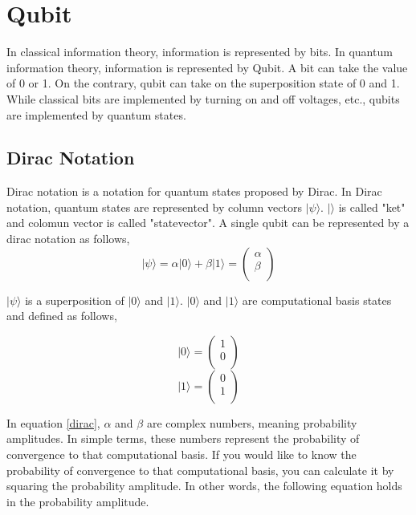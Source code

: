 \section{Qubit}
In classical information theory, information is represented by bits.
In quantum information theory, information is represented by Qubit.
A bit can take the value of 0 or 1.
On the contrary, qubit can take on the superposition state of 0 and 1.
While classical bits are implemented by turning on and off voltages, etc., qubits are implemented by quantum states.

\subsection{Dirac Notation}
Dirac notation is a notation for quantum states proposed by Dirac\cite{dirac1939new}.
In Dirac notation, quantum states are represented by column vectors $|\psi\rangle$.
$| \rangle$ is called "ket" and colomun vector is called "statevector".
A single qubit can be represented by a dirac notation as follows,
\begin{equation}
    \label{dirac}
    |\psi\rangle = \alpha |0\rangle + \beta |1\rangle = 
    \begin{pmatrix}
        \alpha \\
        \beta \\
    \end{pmatrix}
\end{equation}

$|\psi\rangle$ is a superposition of $|0\rangle$ and $|1\rangle$.
$|0\rangle$ and $|1\rangle$ are computational basis states and defined as follows,

\begin{equation}
    |0\rangle = 
    \begin{pmatrix}
        1 \\
        0 \\
    \end{pmatrix}
\end{equation}
\begin{equation}
    |1\rangle = 
    \begin{pmatrix}
        0 \\
        1 \\
    \end{pmatrix}
\end{equation}

In equation \ref{dirac}, $\alpha$ and $\beta$ are complex numbers, meaning probability amplitudes.
In simple terms, these numbers represent the probability of convergence to that computational basis.
If you would like to know the probability of convergence to that computational basis, you can calculate it by squaring the probability amplitude.
In other words, the following equation holds in the probability amplitude.

